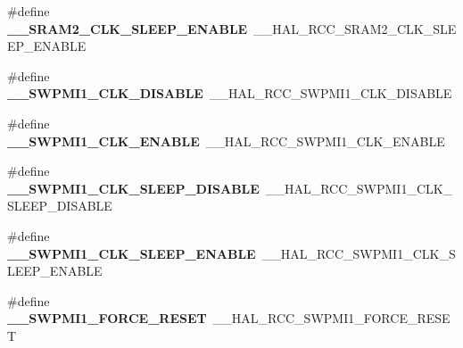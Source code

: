\begin{DoxyCompactItemize}
\item 
\#define {\bfseries \+\_\+\+\_\+\+S\+R\+A\+M2\+\_\+\+C\+L\+K\+\_\+\+S\+L\+E\+E\+P\+\_\+\+E\+N\+A\+B\+LE}~\+\_\+\+\_\+\+H\+A\+L\+\_\+\+R\+C\+C\+\_\+\+S\+R\+A\+M2\+\_\+\+C\+L\+K\+\_\+\+S\+L\+E\+E\+P\+\_\+\+E\+N\+A\+B\+LE\hypertarget{group___h_a_l___r_c_c___aliased_ga10a4a62a0e9b308c8b7fdd45951efc71}{}\label{group___h_a_l___r_c_c___aliased_ga10a4a62a0e9b308c8b7fdd45951efc71}

\item 
\#define {\bfseries \+\_\+\+\_\+\+S\+W\+P\+M\+I1\+\_\+\+C\+L\+K\+\_\+\+D\+I\+S\+A\+B\+LE}~\+\_\+\+\_\+\+H\+A\+L\+\_\+\+R\+C\+C\+\_\+\+S\+W\+P\+M\+I1\+\_\+\+C\+L\+K\+\_\+\+D\+I\+S\+A\+B\+LE\hypertarget{group___h_a_l___r_c_c___aliased_gada7c5432ad22e6214be6c30fdbac9638}{}\label{group___h_a_l___r_c_c___aliased_gada7c5432ad22e6214be6c30fdbac9638}

\item 
\#define {\bfseries \+\_\+\+\_\+\+S\+W\+P\+M\+I1\+\_\+\+C\+L\+K\+\_\+\+E\+N\+A\+B\+LE}~\+\_\+\+\_\+\+H\+A\+L\+\_\+\+R\+C\+C\+\_\+\+S\+W\+P\+M\+I1\+\_\+\+C\+L\+K\+\_\+\+E\+N\+A\+B\+LE\hypertarget{group___h_a_l___r_c_c___aliased_ga6ebd99e0c438717ba9d0f4c33dfee5c7}{}\label{group___h_a_l___r_c_c___aliased_ga6ebd99e0c438717ba9d0f4c33dfee5c7}

\item 
\#define {\bfseries \+\_\+\+\_\+\+S\+W\+P\+M\+I1\+\_\+\+C\+L\+K\+\_\+\+S\+L\+E\+E\+P\+\_\+\+D\+I\+S\+A\+B\+LE}~\+\_\+\+\_\+\+H\+A\+L\+\_\+\+R\+C\+C\+\_\+\+S\+W\+P\+M\+I1\+\_\+\+C\+L\+K\+\_\+\+S\+L\+E\+E\+P\+\_\+\+D\+I\+S\+A\+B\+LE\hypertarget{group___h_a_l___r_c_c___aliased_gae4421172c1cea5e53893e6f3f41729bf}{}\label{group___h_a_l___r_c_c___aliased_gae4421172c1cea5e53893e6f3f41729bf}

\item 
\#define {\bfseries \+\_\+\+\_\+\+S\+W\+P\+M\+I1\+\_\+\+C\+L\+K\+\_\+\+S\+L\+E\+E\+P\+\_\+\+E\+N\+A\+B\+LE}~\+\_\+\+\_\+\+H\+A\+L\+\_\+\+R\+C\+C\+\_\+\+S\+W\+P\+M\+I1\+\_\+\+C\+L\+K\+\_\+\+S\+L\+E\+E\+P\+\_\+\+E\+N\+A\+B\+LE\hypertarget{group___h_a_l___r_c_c___aliased_ga9b6dd1efff55cda34909be38a9435f08}{}\label{group___h_a_l___r_c_c___aliased_ga9b6dd1efff55cda34909be38a9435f08}

\item 
\#define {\bfseries \+\_\+\+\_\+\+S\+W\+P\+M\+I1\+\_\+\+F\+O\+R\+C\+E\+\_\+\+R\+E\+S\+ET}~\+\_\+\+\_\+\+H\+A\+L\+\_\+\+R\+C\+C\+\_\+\+S\+W\+P\+M\+I1\+\_\+\+F\+O\+R\+C\+E\+\_\+\+R\+E\+S\+ET\hypertarget{group___h_a_l___r_c_c___aliased_ga9c0a8cbe546be45dd7c7f0d901b2db76}{}\label{group___h_a_l___r_c_c___aliased_ga9c0a8cbe546be45dd7c7f0d901b2db76}


\end{DoxyCompactItemize}
